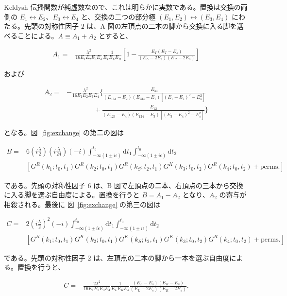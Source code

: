 \documentclass[a4paper,11pt]{ltjsarticle}
\numberwithin{equation}{section}
\newcommand{\dd}{\mathrm{d}}
\newcommand{\Fig}[1]{Fig.~{\ref{#1}}}
\renewcommand{\Fig}[1]{図~\ref{#1}}
\begin{document}
Keldysh 伝播関数が純虚数なので、これは明らかに実数である。置換は交換の両側の $E_1\leftrightarrow E_2$、$E_3\leftrightarrow E_4$ と、交換の二つの部分極 $(E_1,E_2)\leftrightarrow(E_3,E_4)$ にわたる。先頭の対称性因子 $2$ は、A 図の左頂点の二本の脚から交換に入る脚を選べることによる。$A\equiv A_1+A_2$ とすると、

\begin{align}
    A_1 =&  \frac{\lambda^2}{16 E_1 E_2 E_3 E_4} \frac{1}{E_T E_L E_R} \left[1- \frac{E_T(E_T-E_s)}{(E_{L} - 2E_s)(E_{R} - 2E_s)}  \right] 
\end{align}

および

\begin{align}
A_2 =&-  \frac{\lambda^2 }{16 E_1 E_2 E_3 E_4} \Bigg\{ \frac{E_{34}}{(E_{134}-E_2)(E_{234}-E_1)\left[(E_1-E_2)^2 - E_s^2\right]} \nonumber \\
&\qquad \qquad + \frac{E_{12}}{(E_{123}-E_4)(E_{124}-E_3)\left[(E_3-E_4)^2 - E_s^2\right]}\Bigg\}
\end{align}

となる。\Fig{fig:exchange} の第二の図は

\begin{align}\label{eq:B}
B =& 6\left(i \frac{\lambda}{2}\right) \left(i \frac{\lambda}{24}\right) (-i) \int_{-\infty(1\pm i \epsilon)}^{t_0} \dd t_1 \int_{-\infty(1\pm i \epsilon)}^{t_0} \dd t_2  \\
&\left[G^R(k_1; t_0,t_1)  G^R(k_2; t_0,t_1)G^R(k_S; t_2,t_1)  G^K(k_3; t_0,t_2)  G^R(k_4; t_0,t_2)+ \mathrm{perms}.\right] \nonumber
\end{align}

である。先頭の対称性因子 $6$ は、B 図で左頂点の二本、右頂点の三本から交換に入る脚を選ぶ自由度による。置換を行うと $B=A_1-A_2$ となり、$A_2$ の寄与が相殺される。最後に \Fig{fig:exchange} の第三の図は

\begin{align}\label{eq:C}
C =& 2\left(i \frac{\lambda}{2}\right)^2 (-i)\int_{-\infty(1\pm i \epsilon)}^{t_0} \dd t_1 \int_{-\infty(1\pm i \epsilon)}^{t_0} \dd t_2  \\
&\left[G^R(k_1; t_0,t_1)  G^K(k_2; t_0,t_1)  G^K(k_S; t_2,t_1)   G^K(k_3; t_0,t_2)  G^R(k_4; t_0,t_2)+ \mathrm{perms}.\right] \nonumber
\end{align}

である。先頭の対称性因子 $2$ は、左頂点の二本の脚から一本を選ぶ自由度による。置換を行うと、

\begin{align}
C=& \frac{ 2 \lambda^2}{16 E_1 E_2 E_3 E_4} \frac{1}{E_L E_R E_s} \frac{(E_L-E_s)(E_R-E_s)}{(E_L-2E_s)(E_R-2E_s)}.
\end{align}
\end{document}
